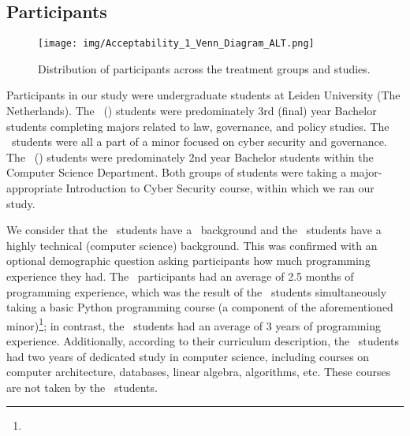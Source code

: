 \subsection{Participants}
\label{ssec:methodology-participants}

\begin{figure}[t]
\texttt{[image: img/Acceptability\_1\_Venn\_Diagram\_ALT.png]}
    \caption{Distribution of participants across the treatment groups and studies.}
    \label{fig:participant-distribution}
\end{figure}



Participants in our study were undergraduate students at Leiden University (The Netherlands). The \ICS\ () students were predominately 3rd (final) year Bachelor students completing majors related to law, governance, and policy studies. The \ICS\ students were all a part of a minor focused on cyber security and governance. The \SEC\ () students were predominately 2nd year Bachelor students within the Computer Science Department.  Both groups of students were taking a major-appropriate Introduction to Cyber Security course, within which we ran our study. 

We consider that the \ICS\ students have a \ background and the \SEC\ students have a highly technical (computer science) background. This was confirmed with an optional demographic question asking participants how much programming experience they had. The \ICS\ participants had an average of 2.5 months of programming experience, which was the result of the \ICS\ students simultaneously taking a basic Python programming course (a component of the aforementioned minor)\footnote{}; in contrast, the \SEC\ students had an average of 3 years of programming experience. Additionally, according to their curriculum description, the \SEC\ students had two years of dedicated study in computer science, including courses on computer architecture, databases, linear algebra, algorithms, etc. These courses are not taken by the \ICS\ students. 


